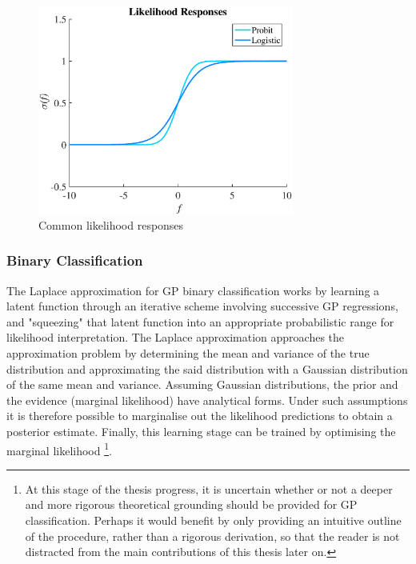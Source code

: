 				\begin{figure}[!htbp]
					\centering
						\includegraphics[width=0.75\textwidth]{Figures/responses.eps}
					\caption{Common likelihood responses}
					\label{Figure:LikelihoodResponses}
				\end{figure}
				
			\subsubsection{Binary Classification}
			
				The Laplace approximation for GP binary classification works by learning a latent function through an iterative scheme involving successive GP regressions, and "squeezing" that latent function into an appropriate probabilistic range for likelihood interpretation. The Laplace approximation approaches the approximation problem by determining the mean and variance of the true distribution and approximating the said distribution with a Gaussian distribution of the same mean and variance. Assuming Gaussian distributions, the prior and the evidence (marginal likelihood) have analytical forms. Under such assumptions it is therefore possible to marginalise out the likelihood predictions to obtain a posterior estimate. Finally, this learning stage can be trained by optimising the marginal likelihood \footnote{{\color{BurntOrange} At this stage of the thesis progress, it is uncertain whether or not a deeper and more rigorous theoretical grounding should be provided for GP classification. Perhaps it would benefit by only providing an intuitive outline of the procedure, rather than a rigorous derivation, so that the reader is not distracted from the main contributions of this thesis later on.}}.
				
